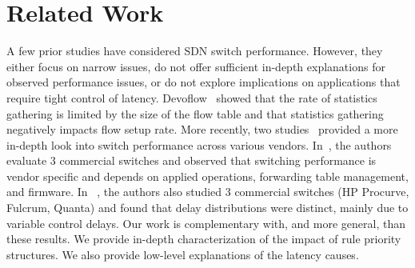 \section{Related Work}
\label{sec:related}

A few prior studies have considered SDN switch performance. However, 
they either focus on narrow issues, do not offer
sufficient in-depth explanations for observed performance issues, or do
not explore implications on applications that require tight
control of latency.  Devoflow~\cite{devoflow} showed that the rate of statistics
gathering is limited by the size of the flow table and that statistics
gathering negatively impacts flow setup rate.  More recently, two
studies~\cite{oflops,ucsdpaper} provided a more in-depth look into
switch performance across various vendors.  In~\cite{oflops}, the
authors evaluate 3 commercial switches and observed that switching
performance is vendor specific and depends on applied operations,
forwarding table management, and firmware. In ~\cite{ucsdpaper}, the
authors also studied 3 commercial switches (HP Procurve, Fulcrum,
Quanta) and found that delay distributions were distinct, mainly due
to variable control delays.  Our work is complementary with, and more
general, than these results. We provide in-depth characterization of the impact of
rule priority structures. We also provide
low-level explanations of the latency causes.



